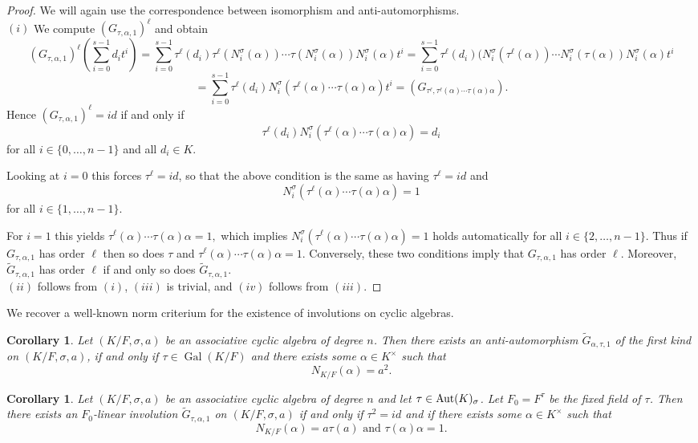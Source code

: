 \documentclass{amsart}
\theoremstyle{plain}
\newtheorem{corollary}[theorem]{Corollary}
\theoremstyle{definition}
\numberwithin{equation}{section}
\numberwithin{figure}{section}
\DeclareMathOperator{\Gal}{Gal}
\begin{document}
\begin{proof}
We will  again use the correspondence between isomorphism  and anti-automorphisms.
\\
$(i) $ We compute $( G_{\tau,\alpha,1})^\ell$ and obtain
$$( G_{\tau,\alpha,1})^\ell(\sum_{i=0}^{s-1}d_it^i)=
\sum_{i=0}^{s-1}\tau^\ell(d_i) \tau^\ell(N^{\sigma}_i(\alpha))\cdots \tau(N^{\sigma}_i(\alpha))N^{\sigma}_i(\alpha) t^{i}
=\sum_{i=0}^{s-1}\tau^\ell(d_i) (N^{\sigma}_i(\tau^\ell(\alpha))\cdots N^{\sigma}_i(\tau(\alpha))N^{\sigma}_i(\alpha) t^{i}
$$
$$=\sum_{i=0}^{s-1}\tau^\ell(d_i) N^{\sigma}_i(\tau^\ell(\alpha)\cdots \tau(\alpha)\alpha) t^{i}= (G_{\tau^\ell,\tau^\ell(\alpha)\cdots \tau(\alpha)\alpha}).
$$
Hence  $(G_{\tau,\alpha,1})^\ell=id$  if and only if
$$\tau^\ell(d_i) N^\sigma_i(\tau^\ell(\alpha)\cdots \tau(\alpha)\alpha)=d_i$$
for all $i\in \{0,\dots,n-1\}$  and all $d_i\in K$.

Looking at $i=0$ this forces $\tau^\ell=id$, so that the above condition is the same as having $\tau^\ell=id$ and
$$N^\sigma_i(\tau^\ell(\alpha)\cdots \tau(\alpha)\alpha)=1$$
for all $i\in \{1,\dots,n-1\}$.

For $i=1$ this yields $\tau^\ell(\alpha)\cdots \tau(\alpha)\alpha=1,$
which implies  $N^\sigma_i(\tau^\ell(\alpha)\cdots \tau(\alpha)\alpha)=1$ holds automatically
for all $i\in \{2,\dots,n-1\}$.
Thus if $G_{\tau,\alpha,1}$ has order $\ell$ then so does $\tau$ and $\tau^\ell(\alpha)\cdots \tau(\alpha)\alpha=1.$
 Conversely, these two conditions imply that $G_{\tau,\alpha,1}$ has order $\ell$.  Moreover, $\widetilde G_{\tau,\alpha,1}$ has order $\ell$ if and only so does $\widetilde G_{\tau,\alpha,1}$.
\\ $(ii)$ follows from $(i)$, $(iii)$ is trivial, and
 $(iv)$ follows from $(iii)$.
 \end{proof}

 We recover a well-known norm criterium for the existence of involutions on cyclic algebras.


\begin{corollary}
Let  $(K/F,\sigma,a)$ be an associative cyclic algebra of degree $n$. Then there exists an  anti-automorphism
$\widetilde G_{\alpha,\tau,1}$ of the first kind on $(K/F,\sigma,a)$, if and only if $\tau\in\Gal(K/F)$  and there exists  some $\alpha\in K^\times$ such that
$$N_{K/F}( \alpha)= a^2.$$
\end{corollary}


\begin{corollary}\label{cor:inv}
Let  $(K/F,\sigma,a)$ be an associative cyclic algebra of degree $n$ and let $\tau \in {\rm Aut}(K)_\sigma$. Let $F_0=F^\tau$ be the fixed field of $\tau$.
Then there exists an $F_0$-linear involution $\widetilde G_{\tau,\alpha,1}$ on $(K/F,\sigma,a)$
 if and only if $\tau^2=id$ and if there exists  some $\alpha\in K^\times$ such that
$$N_{K/F}( \alpha)=  a\tau(a) \text{ and }  \tau(\alpha)\alpha=1.$$
\end{corollary}
\end{document}
